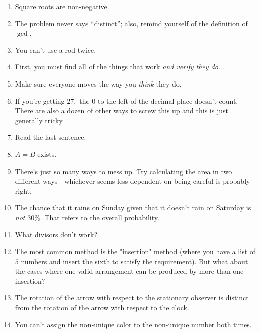 \documentclass[mast]{lucky}
\begin{document}
\begin{enumerate}
    
    \item Square roots are non-negative.
    
    \item The problem never says ``distinct''; also, remind yourself of the definition of $\gcd$.
    
    \item You can't use a rod twice.

    \item First, you must find all of the things that work \emph{and verify they do}...
    
    \item Make sure everyone moves the way you \textit{think} they do.

    \item If you're getting $27,$ the $0$ to the left of the decimal place doesn't count. There are also a dozen of other ways to screw this up and this is just generally tricky.
    
    \item Read the last sentence.
    
    \item $A=B$ exists.
    
    \item There's just so many ways to mess up. Try calculating the area in two different ways - whichever seems less dependent on being careful is probably right.
    
    \item The chance that it rains on Sunday given that it doesn't rain on Saturday is \emph{not} $30\%.$ That refers to the overall probability.
    
    \item What divisors don't work?
    
    \item The most common method is the "insertion" method (where you have a list of $5$ numbers and insert the sixth to satisfy the requirement). But what about the cases where one valid arrangement can be produced by more than one insertion?
    
    \item The rotation of the arrow with respect to the stationary observer is distinct from the rotation of the arrow with respect to the clock.
    
    \item You can't assign the non-unique color to the non-unique number both times.
    

\end{enumerate}
\end{document}
